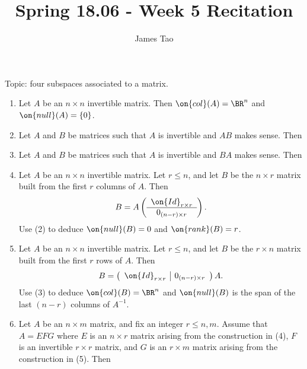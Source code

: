 \documentclass[10pt]{amsart}
\title{Spring 18.06 - Week 5 Recitation}
\author{James Tao}
\theoremstyle{mythm}
\theoremstyle{definition}
\theoremstyle{myrmk}
\begin{document}
	\thispagestyle{fancy}
	
	Topic: four subspaces associated to a matrix. 
	
	\begin{enumerate}[label=(\arabic*), itemsep = 0.6in]
		\item Let $A$ be an $n \times n$ invertible matrix. Then $\on{col}(A) = \BR^n$ and $\on{null}(A) = \{0\}$. 
		\item Let $A$ and $B$ be matrices such that $A$ is invertible and $AB$ makes sense. Then 
		\item Let $A$ and $B$ be matrices such that $A$ is invertible and $BA$ makes sense. Then 
		\item Let $A$ be an $n \times n$ invertible matrix. Let $r \le n$, and let $B$ be the $n \times r$ matrix built from the first $r$ columns of $A$. Then 
		\[
			B = A\left( \begin{array}{c} \on{Id}_{r \times r} \\ \hline 0_{(n-r) \times r}\end{array} \right). 
		\]
		Use (2) to deduce $\on{null}(B) = 0$ and $\on{rank}(B) = r$. 
		\item Let $A$ be an $n \times n$ invertible matrix. Let $r \le n$, and let $B$ be the $r \times n$ matrix built from the first $r$ rows of $A$. Then 
		\[
			B = \left( \begin{array}{c|c} \on{Id}_{r \times r} & 0_{(n-r) \times r}\end{array} \right) A. 
		\]
		Use (3) to deduce $\on{col}(B) = \BR^n$ and $\on{null}(B)$ is the span of the last $(n-r)$ columns of $A^{-1}$. 
		\item Let $A$ be an $n \times m$ matrix, and fix an integer $r \le n, m$.  Assume that $A = EFG$ where $E$ is an $n \times r$ matrix arising from the construction in (4), $F$ is an invertible $r \times r$ matrix, and $G$ is an $r \times m$ matrix arising from the construction in (5). Then 
\end{enumerate}
\end{document}
